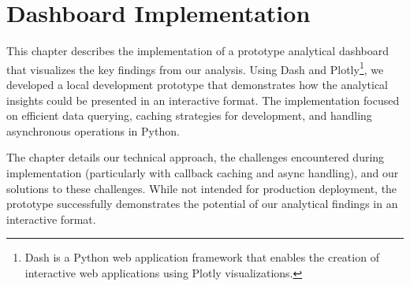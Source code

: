 \chapter{Dashboard Implementation}
\label{ch:dashboard-implementation}

This chapter describes the implementation of a prototype analytical dashboard that visualizes the key findings from our analysis.
Using Dash and Plotly\footnote{Dash is a Python web application framework that enables the creation of interactive web applications using Plotly visualizations\cite{plotly_dash_plotly_com}.},
we developed a local development prototype that demonstrates how the analytical insights could be presented in an interactive format.
The implementation focused on efficient data querying, caching strategies for development, and handling asynchronous operations in Python.

The chapter details our technical approach, the challenges encountered during implementation (particularly with callback caching and async handling), and our solutions to these challenges.
While not intended for production deployment, the prototype successfully demonstrates the potential of our analytical findings in an interactive format.

